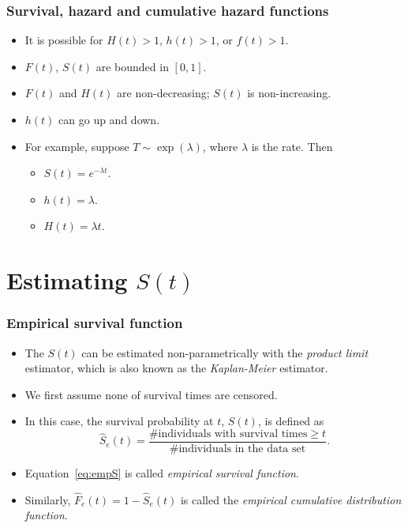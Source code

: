 \documentclass[10pt]{beamer}\usepackage[]{graphicx}\usepackage[]{color}
\newcommand{\empr}[1]{{\emph{\color{red}#1}}}
\begin{document}
\begin{frame}
  \frametitle{Survival, hazard and cumulative hazard functions}
  \begin{itemize}
    \item It is possible for $H(t) > 1$, $h(t) > 1$, or $f(t) > 1$.
    \item $F(t)$, $S(t)$ are bounded in $[0, 1]$.
    \item $F(t)$ and $H(t)$ are non-decreasing; $S(t)$ is non-increasing.
    \item $h(t)$ can go up and down.
    \item For example, suppose $T\sim\exp(\lambda)$, where $\lambda$ is the rate. Then
      \begin{itemize}
      \item $S(t) = e^{-\lambda t}$.
      \item $h(t) = \lambda$.
      \item $H(t) = \lambda t$.
  \end{itemize}
\end{itemize}
\end{frame}

\section{Estimating $S(t)$}

\begin{frame}
  \frametitle{Empirical survival function}
  \begin{itemize}
  \item The $S(t)$ can be estimated non-parametrically with the \empr{product limit} estimator, 
    which is also known as the \empr{Kaplan-Meier} estimator.
  \item We first assume none of survival times are censored. 
  \item In this case, the survival probability at $t$, $S(t)$, is defined as 
    \begin{equation}
      \hat S_e(t) = \frac{\mbox{\# individuals with survival times} \ge t}{\mbox{\# individuals in the data set}}.
        \label{eq:empS}
    \end{equation}
  \item Equation~\eqref{eq:empS} is called \empr{empirical survival function}. 
  \item Similarly, $\hat F_e(t) = 1 - \hat S_e(t)$ is called the \empr{empirical cumulative distribution function}.
    \end{itemize}
\end{frame}
\end{document}
